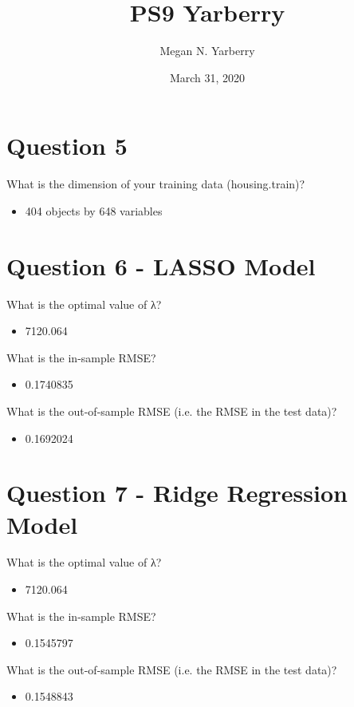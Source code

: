 \documentclass{article}
\title{PS9 Yarberry}
\author{Megan N. Yarberry }
\date{March 31, 2020}
\begin{document}
\maketitle

\section{Question 5}
What is the dimension of your training data (housing.train)?
\begin{itemize}
\item 404 objects by 648 variables 
\end{itemize}

\section{Question 6 - LASSO Model}
What is the optimal value of λ? 
\begin{itemize} 
\item 7120.064
\end{itemize}
What is the in-sample RMSE?
\begin{itemize}
\item  0.1740835
\end{itemize}
What is the out-of-sample RMSE (i.e. the RMSE in the test data)?
\begin{itemize}
\item 0.1692024
\end{itemize}

\section{Question 7 - Ridge Regression Model}
What is the optimal value of λ? 
\begin{itemize}
\item 7120.064
\end{itemize}
What is the in-sample RMSE?
\begin{itemize}
\item 0.1545797
\end{itemize}
What is the out-of-sample RMSE (i.e. the RMSE in the test data)?
\begin{itemize}
\item 0.1548843
\end{itemize}
\end{document}

